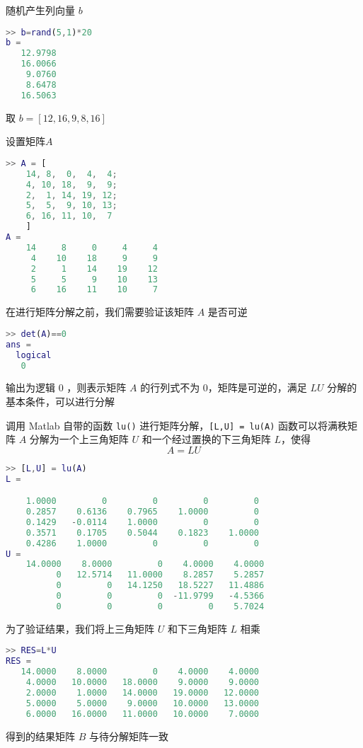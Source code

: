 随机产生列向量 $b$
\begin{lstlisting}[language=Matlab]  
>> b=rand(5,1)*20
b =
   12.9798
   16.0066
    9.0760
    8.6478
   16.5063
\end{lstlisting}

取 $b=[12,16,9,8,16]$

设置矩阵$A$
\begin{lstlisting}[language=Matlab]  
>> A = [
    14, 8,  0,  4,  4;
    4, 10, 18,  9,  9;
    2,  1, 14, 19, 12; 
    5,  5,  9, 10, 13; 
    6, 16, 11, 10,  7
    ]
A =
    14     8     0     4     4
     4    10    18     9     9
     2     1    14    19    12
     5     5     9    10    13
     6    16    11    10     7
\end{lstlisting}

在进行矩阵分解之前，我们需要验证该矩阵 $A$ 是否可逆
\begin{lstlisting}[language=Matlab]  
>> det(A)==0
ans =
  logical
   0
\end{lstlisting}
输出为逻辑 $0$ ，则表示矩阵 $A$ 的行列式不为 $0$，矩阵是可逆的，满足 $LU$ 分解的基本条件，可以进行分解


调用 Matlab 自带的函数 \lstinline|lu()| 进行矩阵分解，\lstinline|[L,U] = lu(A)| 函数可以将满秩矩阵 $A$ 分解为一个上三角矩阵 $U$ 和一个经过置换的下三角矩阵 $L$，使得
\begin{equation}
    A = LU
\end{equation}

\begin{lstlisting}[language=Matlab]  
>> [L,U] = lu(A)
L =

    1.0000         0         0         0         0
    0.2857    0.6136    0.7965    1.0000         0
    0.1429   -0.0114    1.0000         0         0
    0.3571    0.1705    0.5044    0.1823    1.0000
    0.4286    1.0000         0         0         0
U =
    14.0000    8.0000         0    4.0000    4.0000
          0   12.5714   11.0000    8.2857    5.2857
          0         0   14.1250   18.5227   11.4886
          0         0         0  -11.9799   -4.5366
          0         0         0         0    5.7024
\end{lstlisting}

为了验证结果，我们将上三角矩阵 $U$ 和下三角矩阵 $L$ 相乘
\begin{lstlisting}[language=Matlab]  
>> RES=L*U
RES =
   14.0000    8.0000         0    4.0000    4.0000
    4.0000   10.0000   18.0000    9.0000    9.0000
    2.0000    1.0000   14.0000   19.0000   12.0000
    5.0000    5.0000    9.0000   10.0000   13.0000
    6.0000   16.0000   11.0000   10.0000    7.0000
\end{lstlisting}
得到的结果矩阵 $B$ 与待分解矩阵一致



